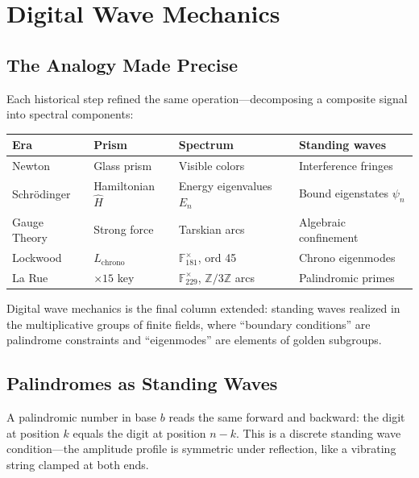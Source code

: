 \documentclass[12pt,oneside]{article}
\theoremstyle{principia}
\theoremstyle{definition}
\theoremstyle{remark}
\providecommand{\ZZ}{\mathbb{Z}}
\providecommand{\FF}{\mathbb{F}}
\begin{document}
\section{Digital Wave Mechanics}

\subsection{The Analogy Made Precise}

Each historical step refined the same operation---decomposing a composite signal into spectral components:

\begin{center}
\begin{tabular}{@{}llll@{}}
\toprule
\textbf{Era} & \textbf{Prism} & \textbf{Spectrum} & \textbf{Standing waves} \\
\midrule
Newton & Glass prism & Visible colors & Interference fringes \\
Schr\"odinger & Hamiltonian $\hat{H}$ & Energy eigenvalues $E_n$ & Bound eigenstates $\psi_n$ \\
Gauge Theory & Strong force & Tarskian arcs & Algebraic confinement \\
Lockwood & $L_{\mathrm{chrono}}$ & $\FF_{181}^\times$, ord 45 & Chrono eigenmodes \\
La Rue & $\times 15$ key & $\FF_{229}^\times$, $\ZZ/3\ZZ$ arcs & Palindromic primes \\
\bottomrule
\end{tabular}
\end{center}

Digital wave mechanics is the final column extended: standing waves realized in the multiplicative groups of finite fields, where ``boundary conditions'' are palindrome constraints and ``eigenmodes'' are elements of golden subgroups.

\subsection{Palindromes as Standing Waves}

A palindromic number in base $b$ reads the same forward and backward: the digit at position $k$ equals the digit at position $n - k$. This is a discrete standing wave condition---the amplitude profile is symmetric under reflection, like a vibrating string clamped at both ends.
\end{document}
